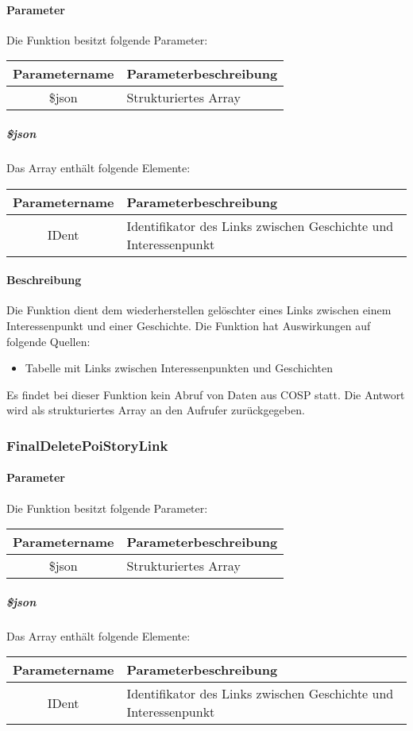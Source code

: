 \paragraph{Parameter} Die Funktion besitzt folgende Parameter:
\begin{table}[H]
	\begin{tabular}{|c|p{11cm}|}
		\hline
		\textbf{Parametername} & \textbf{Parameterbeschreibung} \\ \hline
		\$json & Strukturiertes Array \\ \hline
	\end{tabular}
\end{table}
\subparagraph{\$json}Das Array enthält folgende Elemente:
\begin{table}[H]
	\begin{tabular}{|c|p{11cm}|}
		\hline
		\textbf{Parametername} & \textbf{Parameterbeschreibung} \\ \hline
		IDent & Identifikator des Links zwischen Geschichte und Interessenpunkt \\ \hline
	\end{tabular}
\end{table}
\paragraph{Beschreibung} Die Funktion dient dem wiederherstellen gelöschter eines Links zwischen einem Interessenpunkt und einer Geschichte. Die Funktion hat Auswirkungen auf folgende Quellen:
\begin{itemize}
	\item Tabelle mit Links zwischen Interessenpunkten und Geschichten
\end{itemize}
Es findet bei dieser Funktion kein Abruf von Daten aus {\glqq COSP\grqq} statt. Die Antwort wird als strukturiertes Array an den Aufrufer zurückgegeben.
\subsubsection{FinalDeletePoiStoryLink}
\paragraph{Parameter} Die Funktion besitzt folgende Parameter:
\begin{table}[H]
	\begin{tabular}{|c|p{11cm}|}
		\hline
		\textbf{Parametername} & \textbf{Parameterbeschreibung} \\ \hline
		\$json & Strukturiertes Array \\ \hline
	\end{tabular}
\end{table}
\subparagraph{\$json}Das Array enthält folgende Elemente:
\begin{table}[H]
	\begin{tabular}{|c|p{11cm}|}
		\hline
		\textbf{Parametername} & \textbf{Parameterbeschreibung} \\ \hline
		IDent & Identifikator des Links zwischen Geschichte und Interessenpunkt \\ \hline
	\end{tabular}
\end{table}
